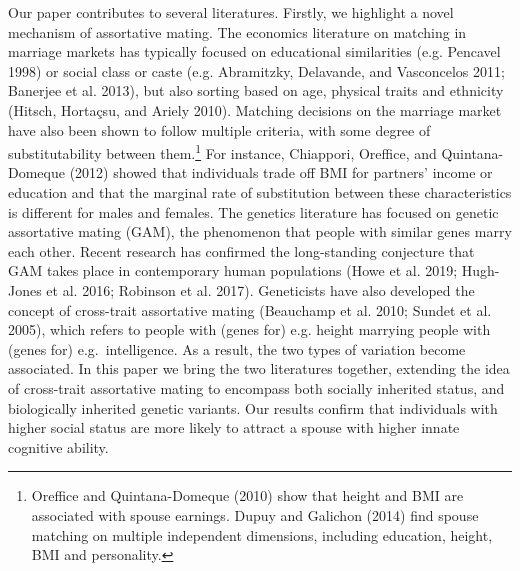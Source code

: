 \documentclass[
]{article}
\begin{document}
Our paper contributes to several literatures. Firstly, we highlight a novel
mechanism of assortative mating. The economics literature on matching in
marriage markets has typically focused on educational similarities
(e.g. Pencavel 1998) or social class or caste
(e.g. Abramitzky, Delavande, and Vasconcelos 2011; Banerjee et al. 2013), but also sorting based on age,
physical traits and ethnicity (Hitsch, Hortaçsu, and Ariely 2010). Matching decisions on the
marriage market have also been shown to follow multiple criteria, with some
degree of substitutability between them.\footnote{Oreffice and Quintana-Domeque (2010) show that height and BMI are associated with spouse earnings. Dupuy and Galichon (2014) find spouse matching on multiple independent dimensions, including education, height, BMI and personality.} For instance, Chiappori, Oreffice, and Quintana-Domeque (2012)
showed that individuals trade off BMI for partners' income or education and that
the marginal rate of substitution between these characteristics is different for
males and females. The genetics literature has focused on genetic assortative
mating (GAM), the phenomenon that people with similar genes marry each other.
Recent research has confirmed the long-standing conjecture that GAM takes place
in contemporary human populations
(Howe et al. 2019; Hugh-Jones et al. 2016; Robinson et al. 2017). Geneticists have
also developed the concept of cross-trait assortative mating
(Beauchamp et al. 2010; Sundet et al. 2005), which refers to people with (genes for) e.g.
height marrying people with (genes for) e.g.~intelligence. As a result, the two
types of variation become associated. In this paper we bring the two literatures
together, extending the idea of cross-trait assortative mating to encompass both
socially inherited status, and biologically inherited genetic variants. Our
results confirm that individuals with higher social status are more likely to
attract a spouse with higher innate cognitive ability.
\end{document}
